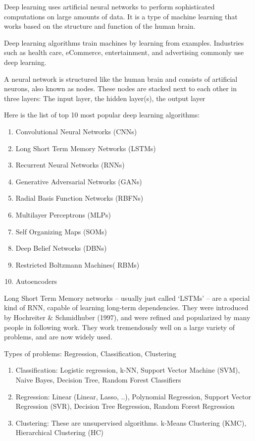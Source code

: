 \documentclass[11pt]{article}
\begin{document}
Deep learning uses artificial neural networks to perform sophisticated computations on large amounts of data. It is a type of machine learning that works based on the structure and function of the human brain. 

Deep learning algorithms train machines by learning from examples. Industries such as health care, eCommerce, entertainment, and advertising commonly use deep learning.


A neural network is structured like the human brain and consists of artificial neurons, also known as nodes. These nodes are stacked next to each other in three layers:
The input layer, the hidden layer(s), the output layer



Here is the list of top 10 most popular deep learning algorithms:
\begin{enumerate}
\item Convolutional Neural Networks (CNNs)
\item Long Short Term Memory Networks (LSTMs)
\item Recurrent Neural Networks (RNNs)
\item Generative Adversarial Networks (GANs)
\item Radial Basis Function Networks (RBFNs)
\item Multilayer Perceptrons (MLPs)
\item Self Organizing Maps (SOMs)
\item Deep Belief Networks (DBNs)
\item Restricted Boltzmann Machines( RBMs)
\item Autoencoders
\end{enumerate} 

Long Short Term Memory networks – usually just called `LSTMs' – are a special kind of RNN, 
capable of learning long-term dependencies. 
They were introduced by Hochreiter \& Schmidhuber (1997), 
and were refined and popularized by many people in following work.
They work tremendously well on a large variety of problems, and are now widely used.




Types of problems: Regression, Classification, Clustering 

\begin{enumerate}
\item Classification: Logistic regression, k-NN, Support Vector Machine (SVM), Naive Bayes, Decision Tree, Random Forest Classifiers
\item Regression: Linear (Linear, Lasso, ..), Polynomial Regression, Support Vector Regression (SVR), Decision Tree Regression, Random Forest Regression
\item Clustering: These are unsupervised algorithms. k-Means Clustering (KMC), Hierarchical Clustering (HC)
\end{enumerate}
\end{document}
